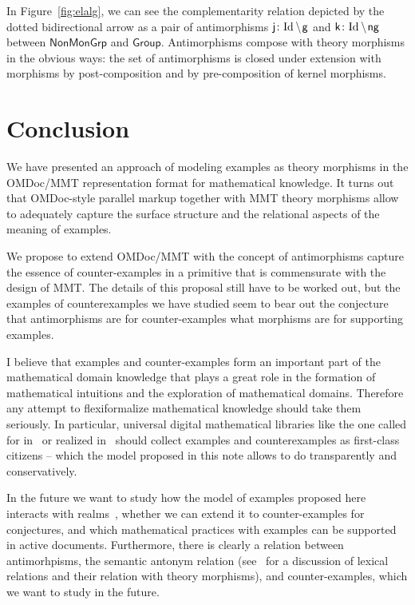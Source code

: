 \documentclass[11pt]{bluenote}
\def\setdiff#1#2{#1\kern.2em\backslash\kern.1em #2}
\def\cn#1{\mathsf{#1}}
\def\mmt{MMT\xspace}
\def\omdoc{OMDoc\xspace}
\def\omdoc{OMDoc\xspace}
\def\id{\text{Id}}
\begin{document}
In Figure~\ref{fig:elalg}, we can see the complementarity relation depicted by the dotted
bidirectional arrow as a pair of antimorphisms $\cn{j}\colon\setdiff\id{\cn{g}}$ and
$\cn{k}\colon\setdiff\id{\cn{ng}}$ between $\cn{NonMonGrp}$ and $\cn{Group}$. Antimorphisms
compose with theory morphisms in the obvious ways: the set of antimorphisms is closed
under extension with morphisms by post-composition and by pre-composition of kernel
morphisms.

\section{Conclusion}

We have presented an approach of modeling examples as theory morphisms in the \omdoc/\mmt
representation format for mathematical knowledge.  It turns out that \omdoc-style parallel
markup together with \mmt theory morphisms allow to adequately capture the surface
structure and the relational aspects of the meaning of examples.

We propose to extend \omdoc/\mmt with the concept of antimorphisms capture the essence of
counter-examples in a primitive that is commensurate with the design of \mmt. The details
of this proposal still have to be worked out, but the examples of counterexamples we have
studied seem to bear out the conjecture that antimorphisms are for counter-examples what
morphisms are for supporting examples. 

I believe that examples and counter-examples form an important part of the mathematical
domain knowledge that plays a great role in the formation of mathematical intuitions and
the exploration of mathematical domains. Therefore any attempt to flexiformalize
mathematical knowledge should take them seriously. In particular, universal digital
mathematical libraries like the one called for in~\cite{Farmer:mkm11} or realized
in~\cite{IanJucKoh:sdm14,MathHub:on} should collect examples and counterexamples as
first-class citizens -- which the model proposed in this note allows to do transparently
and conservatively.

In the future we want to study how the model of examples proposed here interacts with
realms~\cite{CarFarKoh:rsckmt14}, whether we can extend it to counter-examples for
conjectures, and which mathematical practices with examples can be supported in active
documents. Furthermore, there is clearly a relation between antimorhpisms, the semantic
antonym relation (see~\cite{Kohlhase:dmesmgm14} for a discussion of lexical relations and
their relation with theory morphisms), and counter-examples, which we want to study in the
future.

\printbibliography
\end{document}
